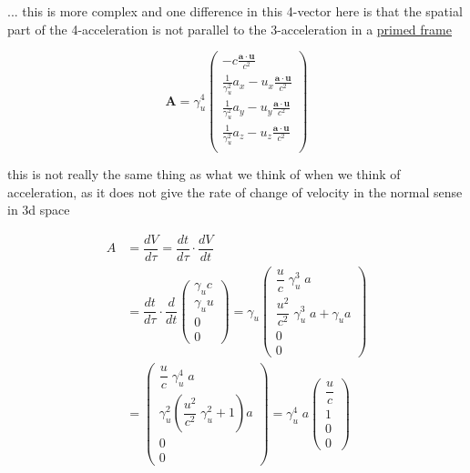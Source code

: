 ... this is more complex and one difference in this 4-vector here is that the spatial part of the 4-acceleration is not parallel to the 3-acceleration in a \hyperlink{def-Primed-Frame}{primed frame}

\begin{equation}
	\mathbf{A} = {\gamma}_{u}^4
	\begin{pmatrix}
		-c\frac{\mathbf{a}\cdot\mathbf{u}}{{c}^2}                                  \\
		\frac{1}{{\gamma}_{u}^2} {{a}_{x}}-{{u}_{x}} \frac{\mathbf{a}\cdot\mathbf{u}}{{c}^2} \\
		\frac{1}{{\gamma}_{u}^2} {{a}_{y}}-{{u}_{y}} \frac{\mathbf{a}\cdot\mathbf{u}}{{c}^2} \\
		\frac{1}{{\gamma}_{u}^2} {{a}_{z}}-{{u}_{z}} \frac{\mathbf{a}\cdot\mathbf{u}}{{c}^2} \\
	\end{pmatrix}
\end{equation}

this is not really the same thing as what we think of when we think of acceleration, as it does not give the rate of change of velocity in the normal sense in 3d space

\begin{equation}
	\begin{aligned}
		A & = \dfrac{dV}{d\tau} =
		\dfrac{dt}{d\tau}\cdot\dfrac{dV}{dt}                                                                                                                                   \\
		  & = \dfrac{dt}{d\tau}\cdot \dfrac{d}{dt}
		\left(\begin{array}{*{20}{c}} {\gamma}_{u}{c}\\ {\gamma}_{u} u \\ 0 \\ 0 \end{array}\right)
		 = {\gamma}_{u}
		\left(\begin{array}{*{20}{c}} \dfrac{u}{c}\;{\gamma}_{u}^3\;a \\ \dfrac{u^2}{{c}^2}\;{\gamma}_{u}^3\;a + {\gamma}_{u} a \\ 0 \\ 0 \end{array}\right) \\
		  & =
		\left(\begin{array}{*{20}{c}} \dfrac{u}{c}\;{\gamma}_{u}^4\;a \\ {\gamma}_{u}^2\left(\dfrac{u^2}{{c}^2}\;{\gamma}_{u}^2 + 1\right)a \\ 0 \\ 0 \end{array}\right)
		 = {\gamma}_{u}^4\;a
		\left(\begin{array}{*{2}{c}} \dfrac{u}{c} \\ 1 \\ 0 \\ 0 \end{array}\right)
	\end{aligned}
\end{equation}

